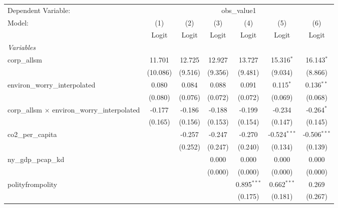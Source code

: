 
\begingroup
\centering
\begin{tabular}{lcccccc}
   \toprule
   Dependent Variable: & \multicolumn{6}{c}{obs\_value1}\\
   Model:                                                & (1)      & (2)     & (3)     & (4)           & (5)            & (6)\\  
                                                         &  Logit   & Logit   & Logit   & Logit         & Logit          & Logit\\  
   \midrule
   \emph{Variables}\\
   corp\_allsm                                           & 11.701   & 12.725  & 12.927  & 13.727        & 15.316$^{*}$   & 16.143$^{*}$\\   
                                                         & (10.086) & (9.516) & (9.356) & (9.481)       & (9.034)        & (8.866)\\   
   environ\_worry\_interpolated                          & 0.080    & 0.084   & 0.088   & 0.091         & 0.115$^{*}$    & 0.136$^{**}$\\   
                                                         & (0.080)  & (0.076) & (0.072) & (0.072)       & (0.069)        & (0.068)\\   
   corp\_allsm $\times$ environ\_worry\_interpolated     & -0.177   & -0.186  & -0.188  & -0.199        & -0.234         & -0.264$^{*}$\\   
                                                         & (0.165)  & (0.156) & (0.153) & (0.154)       & (0.147)        & (0.145)\\   
   co2\_per\_capita                                      &          & -0.257  & -0.247  & -0.270        & -0.524$^{***}$ & -0.506$^{***}$\\   
                                                         &          & (0.252) & (0.247) & (0.240)       & (0.134)        & (0.139)\\   
   ny\_gdp\_pcap\_kd                                     &          &         & 0.000   & 0.000         & 0.000          & 0.000\\   
                                                         &          &         & (0.000) & (0.000)       & (0.000)        & (0.000)\\   
   polityfrompolity                                      &          &         &         & 0.895$^{***}$ & 0.662$^{***}$  & 0.269\\   
                                                         &          &         &         & (0.175)       & (0.181)        & (0.267)\\   

\end{tabular}
